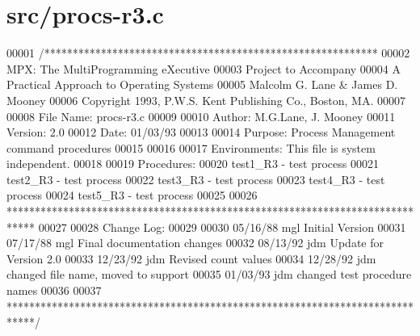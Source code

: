 \hypertarget{procs-r3_8c_source}{
\section{src/procs-\/r3.c}
}

\begin{DoxyCode}
00001 \textcolor{comment}{/***********************************************************}
00002 \textcolor{comment}{        MPX: The MultiProgramming eXecutive}
00003 \textcolor{comment}{        Project to Accompany}
00004 \textcolor{comment}{        A Practical Approach to Operating Systems}
00005 \textcolor{comment}{        Malcolm G. Lane & James D. Mooney}
00006 \textcolor{comment}{        Copyright 1993, P.W.S. Kent Publishing Co., Boston, MA.}
00007 \textcolor{comment}{}
00008 \textcolor{comment}{        File Name: procs-r3.c}
00009 \textcolor{comment}{}
00010 \textcolor{comment}{        Author: M.G.Lane, J. Mooney}
00011 \textcolor{comment}{        Version: 2.0}
00012 \textcolor{comment}{        Date: 01/03/93}
00013 \textcolor{comment}{}
00014 \textcolor{comment}{        Purpose: Process Management command procedures}
00015 \textcolor{comment}{}
00016 \textcolor{comment}{}
00017 \textcolor{comment}{        Environments: This file is system independent.}
00018 \textcolor{comment}{                }
00019 \textcolor{comment}{        Procedures:}
00020 \textcolor{comment}{                             test1\_R3 - test process}
00021 \textcolor{comment}{                             test2\_R3 - test process}
00022 \textcolor{comment}{                             test3\_R3 - test process}
00023 \textcolor{comment}{                             test4\_R3 - test process}
00024 \textcolor{comment}{                             test5\_R3 - test process}
00025 \textcolor{comment}{}
00026 \textcolor{comment}{*****************************************************************************}
00027 \textcolor{comment}{}
00028 \textcolor{comment}{  Change Log:}
00029 \textcolor{comment}{}
00030 \textcolor{comment}{        05/16/88  mgl   Initial Version}
00031 \textcolor{comment}{        07/17/88  mgl   Final documentation changes}
00032 \textcolor{comment}{        08/13/92  jdm   Update for Version 2.0}
00033 \textcolor{comment}{        12/23/92  jdm   Revised count values}
00034 \textcolor{comment}{        12/28/92  jdm   changed file name, moved to support}
00035 \textcolor{comment}{        01/03/93  jdm   changed test procedure names}
00036 \textcolor{comment}{}
00037 \textcolor{comment}{*****************************************************************************/}

\end{DoxyCode}
